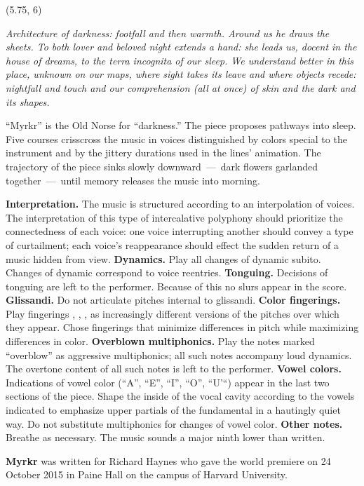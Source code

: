 \documentclass[10pt]{article}
\begin{document}
\begin{textblock}{11.5}(5.75, 6)

\textit{Architecture of darkness: footfall and then warmth. Around us he draws
the sheets. To both lover and beloved night extends a hand: she leads us,
docent in the house of dreams, to the terra incognita of our sleep. We
understand better in this place, unknown on our maps, where sight takes its
leave and where objects recede: nightfall and touch and our comprehension (all
at once) of skin and the dark and its shapes.}

``Myrkr'' is the Old Norse for ``darkness.'' The piece proposes pathways into
sleep. Five courses crisscross the music in voices distinguished by colors
special to the instrument and by the jittery durations used in the lines'
animation. The trajectory of the piece sinks slowly downward~---~dark flowers
garlanded together~---~until memory releases the music into morning.

\textbf{Interpretation.} The music is structured according to an interpolation
of voices. The interpretation of this type of intercalative polyphony should
prioritize the connectedness of each voice: one voice interrupting another
should convey a type of curtailment; each voice's reappearance should effect
the sudden return of a music hidden from view. \textbf{Dynamics.} Play all
changes of dynamic subito. Changes of dynamic correspond to voice reentries.
\textbf{Tonguing.} Decisions of tonguing are left to the performer. Because of
this no slurs appear in the score. \textbf{Glissandi.} Do not articulate
pitches internal to glissandi. \textbf{Color fingerings.} Play fingerings
, , ,  as increasingly different
versions of the pitches over which they appear. Chose fingerings that minimize
differences in pitch while maximizing differences in color. \textbf{Overblown
multiphonics.} Play the notes marked ``overblow'' as aggressive multiphonics;
all such notes accompany loud dynamics. The overtone content of all such notes
is left to the performer. \textbf{Vowel colors.} Indications of vowel color
(``A'', ``E'', ``I'', ``O'', ``U'``) appear in the last two sections of the
piece. Shape the inside of the vocal cavity according to the vowels indicated
to emphasize upper partials of the fundamental in a hautingly quiet way. Do not
substitute multiphonics for changes of vowel color. \textbf{Other notes.}
Breathe as necessary. The music sounds a major ninth lower than written.

\textbf{Myrkr} was written for Richard Haynes who gave the world premiere on 24
October 2015 in Paine Hall on the campus of Harvard University.

\end{textblock}
\end{document}
